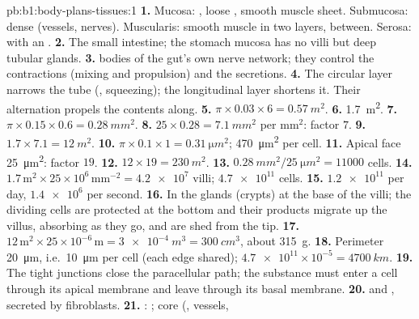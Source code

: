 \begin{solution}{pb:b1:body-plans-tissues:1}
\textbf{1.} Mucosa: , loose , smooth
muscle sheet. Submucosa: dense  (vessels, nerves).
Muscularis: smooth muscle in two layers,  between.
Serosa:  with an .
\textbf{2.} The small intestine; the stomach mucosa has no villi but
deep tubular glands.
\textbf{3.}  bodies of the gut's own nerve network; they control
the contractions (mixing and propulsion) and the secretions.
\textbf{4.} The circular layer narrows the tube (,
squeezing); the longitudinal layer shortens it. Their alternation
propels the contents along.
\textbf{5.} $\pi\times 0.03\times 6 = \qty{0.57}{m^2}$.
\textbf{6.} \qty{1.7}{m^2}.
\textbf{7.} $\pi\times 0.15\times 0.6 = \qty{0.28}{mm^2}$.
\textbf{8.} $25\times 0.28 = \qty{7.1}{mm^2}$ per mm$^2$: factor $7$.
\textbf{9.} $1.7\times 7.1 = \qty{12}{m^2}$.
\textbf{10.} $\pi\times 0.1\times 1 = \qty{0.31}{\micro m^2}$;
\qty{470}{\micro m^2} per cell.
\textbf{11.} Apical face \qty{25}{\micro m^2}: factor $19$.
\textbf{12.} $12\times 19 = \qty{230}{m^2}$.
\textbf{13.} $\qty{0.28}{mm^2}/\qty{25}{\micro m^2} = \num{11000}$ cells.
\textbf{14.} $1.7\,\mathrm{m^2}\times 25\times 10^6\,\mathrm{mm^{-2}} =
\num{4.2e7}$ villi; $\num{4.7e11}$ cells.
\textbf{15.} $\num{1.2e11}$ per day, $\num{1.4e6}$ per second.
\textbf{16.} In the glands (crypts) at the base of the villi; the
dividing cells are protected at the bottom and their products migrate
up the villus, absorbing as they go, and are shed from the tip.
\textbf{17.} $12\,\mathrm{m^2}\times 25\times 10^{-6}\,\mathrm{m} =
\qty{3e-4}{m^3} = \qty{300}{cm^3}$, about \qty{315}{g}.
\textbf{18.} Perimeter \qty{20}{\micro m}, i.e.\ \qty{10}{\micro m} per
cell (each edge shared); $\num{4.7e11}\times 10^{-5} = \qty{4700}{km}$.
\textbf{19.} The tight junctions close the paracellular path; the
substance must enter a cell through its apical membrane and leave
through its basal membrane.
\textbf{20.}  and , secreted by fibroblasts.
\textbf{21.} : ; core (, vessels,

\end{solution}
